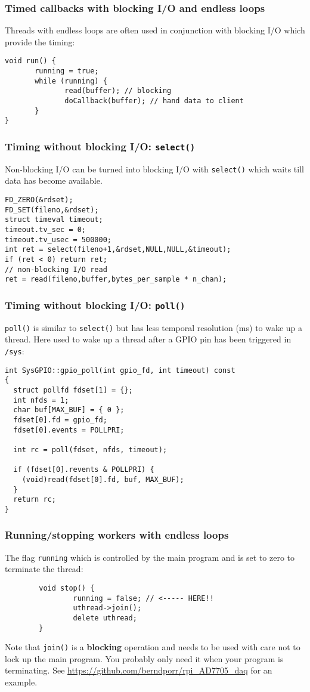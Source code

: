 \documentclass[xcolor=dvipsnames]{beamer}
\begin{document}
\begin{frame}[fragile]
\frametitle{Timed callbacks with blocking I/O and endless loops}
Threads with endless loops are often used in conjunction with blocking
I/O which provide the timing:
\begin{verbatim}
void run() {
       running = true;
       while (running) {
              read(buffer); // blocking
              doCallback(buffer); // hand data to client
       }
}
\end{verbatim}
\end{frame}



\begin{frame}[fragile]
  \frametitle{Timing without blocking I/O: \texttt{select()}}
Non-blocking I/O can be turned into blocking I/O with \texttt{select()}
which waits till data has become available.
\begin{verbatim}
FD_ZERO(&rdset);
FD_SET(fileno,&rdset);
struct timeval timeout;
timeout.tv_sec = 0;
timeout.tv_usec = 500000;
int ret = select(fileno+1,&rdset,NULL,NULL,&timeout);
if (ret < 0) return ret;
// non-blocking I/O read
ret = read(fileno,buffer,bytes_per_sample * n_chan);
\end{verbatim}
\end{frame}


\begin{frame}[fragile]
  \frametitle{Timing without blocking I/O: \texttt{poll()}}
  \texttt{poll()} is similar to \texttt{select()} but
  has less temporal resolution (ms) to wake up a thread.
  Here used to wake up a thread after a GPIO pin has been
  triggered in \texttt{/sys}:
\begin{verbatim}
int SysGPIO::gpio_poll(int gpio_fd, int timeout) const
{
  struct pollfd fdset[1] = {};
  int nfds = 1;
  char buf[MAX_BUF] = { 0 };
  fdset[0].fd = gpio_fd;
  fdset[0].events = POLLPRI;

  int rc = poll(fdset, nfds, timeout);

  if (fdset[0].revents & POLLPRI) {
    (void)read(fdset[0].fd, buf, MAX_BUF);
  }
  return rc;
}
\end{verbatim}
\end{frame}


\begin{frame}[fragile]
\frametitle{Running/stopping workers with endless loops}
The flag \texttt{running} which is controlled by the main program and is set to zero to terminate
the thread:
\begin{verbatim}
        void stop() {
                running = false; // <----- HERE!!
                uthread->join();
                delete uthread;
        }
\end{verbatim}
Note that \texttt{join()} is a \textbf{blocking} operation and needs
to be used with care not to lock up the main program. You probably
only need it when your program is terminating.  See
\url{https://github.com/berndporr/rpi_AD7705_daq} for an example.
\end{frame}
\end{document}
